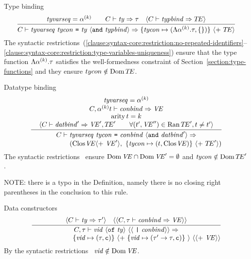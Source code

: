 \begin{inference-rule}{Type binding}
\begin{equation}\label{rule:static-core:type-binding}
  \vcenter{\infer{\C\ts\longtypbind\ra\{\tycon\mapsto(\typefcnk,\emptymap)\}\ \optional{+\ \TE}}
    {\tyvarseq=\alphak\qquad\C\ts\ty\ra\tau
      & \langle\C\ts\typbind\ra\TE\rangle}}
\end{equation}
The syntactic restrictions~(\oldS\oldS\ref{clause:syntax-core:restriction:no-repeated-identifiers}--\ref{clause:syntax-core:restriction:type-variables-uniqueness}) ensure that the type function
$\Lambda\mbox{$\alpha^{(k)}$}.\tau$ satisfies the well-formedness constraint of 
Section~\ref{section:type-functions} and they ensure $tycon\notin\mathop{\rm Dom}\nolimits\mbox{$T\!E$}$.
\end{inference-rule}


\begin{inference-rule}{Datatype binding}
\begin{equation}\label{rule:static-core:datatype-binding}
  \vcenter{\infer{\deduce{\qquad\phantom{\C\ts}\qquad(\cl{}{\VE}\langle +\ \VE'\rangle,\
        \{\tycon\mapsto(\t,\cl{}{\VE})\}\ \langle +\ \TE'\rangle)}{\C\ts\newlongdatbind\ra}}
    {\deduce{\optional{\C\ts\datbind'\ra\VE',\TE'\qquad
        \forall(\t',\VE'')\in\Ran\TE', \t\neq\t'}}
      {\deduce{\arity\t=k}
        {\deduce{\C,\alphakt\ts\constrs\ra\VE}
          {\tyvarseq=\alphak}}}}}
\end{equation}
The syntactic restrictions~ ensure $\mathop{\rm Dom}\nolimits\textit{V\kern-.05emE\/}\cap\mathop{\rm Dom}\nolimits\textit{V\kern-.05emE\/}' = \emptyset$
and $\textit{tycon\/}\notin\mathop{\rm Dom}\nolimits\mbox{$T\!E$}'$.

NOTE: there is a typo in the Definition, namely there is no closing
right parentheses in the conclusion to this rule.
\end{inference-rule}


\begin{inference-rule}{Data constructors}
\begin{equation}\label{rule:static-core:data-constructors}
  \vcenter{\infer{\deduce{\qquad\qquad\qquad\{\vid\mapsto(\tau,\isc)\}\
        \optional{+\ \{\vid\mapsto(\tau'\to\tau,\isc)\}\ }\
        \optional{\optional{+\ \VE}}}
      {\C,\tau\ts\longervidconstrs\ra}}
    {\optional{\C\ts\ty\ra\tau'}
  & \optional{\optional{\C,\tau\ts\constrs\ra\VE}}}}
\end{equation}
By the syntactic restrictions~ $\textit{vid\/}\notin\mathop{\rm Dom}\nolimits\textit{V\kern-.05emE\/}$.
\end{inference-rule}


